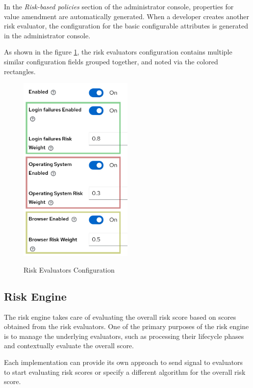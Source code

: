 In the \textit{Risk-based policies} section of the administrator console, properties for value amendment are automatically generated.
When a developer creates another risk evaluator, the configuration for the basic configurable attributes is generated in the administrator console.

As shown in the figure \ref{fig:risk-based-evaluator-config}, the risk evaluators configuration contains multiple similar configuration fields grouped together, and noted via the colored rectangles. 

\begin{figure}[htbp]
  \centering
  \includegraphics[width=0.5\textwidth]{img/sections/5-design/risk-evaluators-config.png}
  \label{fig:risk-based-evaluator-config}
  \caption{Risk Evaluators Configuration}
\end{figure}

\newpage
\subsection{Risk Engine} \label{risk-engine}
The risk engine takes care of evaluating the overall risk score based on scores obtained from the risk evaluators.
One of the primary purposes of the risk engine is to manage the underlying evaluators, such as processing their lifecycle phases and contextually evaluate the overall score.

Each implementation can provide its own approach to send signal to evaluators to start evaluating risk scores or specify a different algorithm for the overall risk score.

